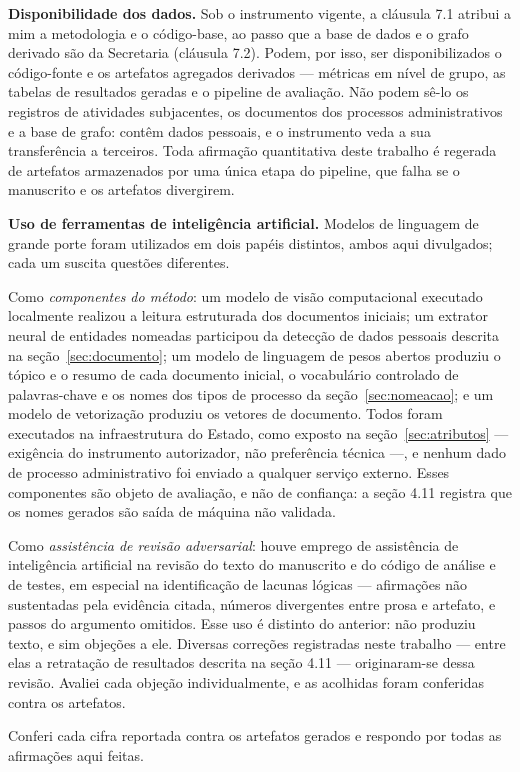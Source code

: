 \textbf{Disponibilidade dos dados.} Sob o instrumento vigente, a cláusula 7.1 atribui a mim a
metodologia e o código-base, ao passo que a base de dados e o grafo derivado são da
Secretaria (cláusula 7.2). Podem, por isso, ser disponibilizados o código-fonte e os artefatos
agregados derivados --- métricas em nível de grupo, as tabelas de resultados geradas e o pipeline
de avaliação. Não podem sê-lo os registros de atividades subjacentes, os documentos dos processos
administrativos e a base de grafo: contêm dados pessoais, e o instrumento veda a sua transferência
a terceiros. Toda afirmação quantitativa deste trabalho é
regerada de artefatos armazenados por uma única etapa do pipeline, que falha se o manuscrito e os
artefatos divergirem.

\textbf{Uso de ferramentas de inteligência artificial.} Modelos de linguagem de grande porte foram
utilizados em dois papéis distintos, ambos aqui divulgados; cada um suscita questões diferentes.

Como \emph{componentes do método}: um modelo de visão computacional executado localmente realizou a
leitura estruturada dos documentos iniciais; um extrator neural de entidades nomeadas
\cite{zaratiana2025gliner2} participou da detecção de dados pessoais descrita na seção~\ref{sec:documento}; um
modelo de linguagem de pesos abertos produziu o tópico e o resumo de cada documento inicial, o
vocabulário controlado de palavras-chave e os nomes dos tipos de processo da seção~\ref{sec:nomeacao}; e um modelo
de vetorização produziu os vetores de documento. Todos foram executados na infraestrutura do
Estado, como exposto na seção~\ref{sec:atributos} --- exigência do instrumento autorizador, não preferência técnica
---, e nenhum dado de processo administrativo foi enviado a qualquer serviço externo. Esses
componentes são objeto de avaliação, e não de confiança: a seção 4.11 registra que os nomes gerados
são saída de máquina não validada.

Como \emph{assistência de revisão adversarial}: houve emprego de assistência de inteligência
artificial na revisão do texto do manuscrito e do código de análise e de testes, em especial na
identificação de lacunas lógicas --- afirmações não sustentadas pela evidência citada, números
divergentes entre prosa e artefato, e passos do argumento omitidos. Esse uso é distinto do
anterior: não produziu texto, e sim objeções a ele. Diversas correções registradas neste trabalho
--- entre elas a retratação de resultados descrita na seção 4.11 --- originaram-se dessa revisão.
Avaliei cada objeção individualmente, e as acolhidas foram conferidas contra os artefatos.

Conferi cada cifra reportada contra os artefatos gerados e respondo por todas as afirmações aqui
feitas.
